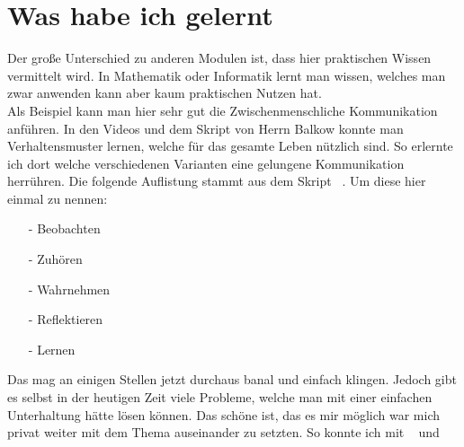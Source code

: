\chapter{Was habe ich gelernt}

Der große Unterschied zu anderen Modulen ist, dass hier praktischen Wissen vermittelt wird. In Mathematik oder Informatik lernt man wissen, welches man zwar anwenden kann aber kaum praktischen Nutzen hat.\\
Als Beispiel kann man hier sehr gut die Zwischenmenschliche Kommunikation anführen. In den Videos und dem Skript von Herrn Balkow konnte man Verhaltensmuster lernen, welche für das gesamte Leben nützlich sind. So erlernte ich dort welche verschiedenen Varianten eine gelungene Kommunikation herrühren. Die folgende Auflistung stammt aus dem Skript ~\cite{Skript}. Um diese hier einmal zu nennen:
\begin{itemize}
	\item[-] Beobachten
	\item[-] Zuhören
	\item[-] Wahrnehmen
	\item[-] Reflektieren
	\item[-] Lernen
\end{itemize} 
 
Das mag an einigen Stellen jetzt durchaus banal und einfach klingen. Jedoch gibt es selbst in der heutigen Zeit viele Probleme, welche man mit einer einfachen Unterhaltung hätte lösen können. Das schöne ist, das es mir möglich war mich privat weiter mit dem Thema auseinander zu setzten. So konnte ich mit ~\cite{Schlüssel} und ~\cite{fRede} 